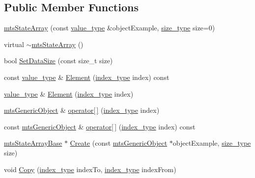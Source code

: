 \subsection*{Public Member Functions}
\begin{DoxyCompactItemize}
\item 
\hyperlink{classmts_state_array_a3100d37141bac1c739cf79fb761b28e8}{mts\-State\-Array} (const \hyperlink{classmts_state_array_a1d78f1e353af8687797d4a359b694ee1}{value\-\_\-type} \&object\-Example, \hyperlink{classmts_state_array_base_a2a29f8b24a48620f67c907fc5592fc17}{size\-\_\-type} size=0)
\item 
virtual \hyperlink{classmts_state_array_a31aea7797304325d5724ac9c52613a3b}{$\sim$mts\-State\-Array} ()
\item 
bool \hyperlink{classmts_state_array_a3864cab02bda42e0e04712423c72ac16}{Set\-Data\-Size} (const size\-\_\-t size)
\item 
const \hyperlink{classmts_state_array_a1d78f1e353af8687797d4a359b694ee1}{value\-\_\-type} \& \hyperlink{classmts_state_array_a8bf09ef47789fa1a66fc22ccb4339164}{Element} (\hyperlink{classmts_state_array_base_a22ecbf65a907a7550951d12970f3df1d}{index\-\_\-type} index) const 
\item 
\hyperlink{classmts_state_array_a1d78f1e353af8687797d4a359b694ee1}{value\-\_\-type} \& \hyperlink{classmts_state_array_a7e6691934e346dc11c24cb9e07e0820c}{Element} (\hyperlink{classmts_state_array_base_a22ecbf65a907a7550951d12970f3df1d}{index\-\_\-type} index)
\item 
\hyperlink{classmts_generic_object}{mts\-Generic\-Object} \& \hyperlink{classmts_state_array_a3ce4d9065a8807833d7ff85c00c66449}{operator\mbox{[}$\,$\mbox{]}} (\hyperlink{classmts_state_array_base_a22ecbf65a907a7550951d12970f3df1d}{index\-\_\-type} index)
\item 
const \hyperlink{classmts_generic_object}{mts\-Generic\-Object} \& \hyperlink{classmts_state_array_a0c002191085699eaaa3fab8d1f8b753e}{operator\mbox{[}$\,$\mbox{]}} (\hyperlink{classmts_state_array_base_a22ecbf65a907a7550951d12970f3df1d}{index\-\_\-type} index) const 
\item 
\hyperlink{classmts_state_array_base}{mts\-State\-Array\-Base} $\ast$ \hyperlink{classmts_state_array_ac82b7151bf8a7e733a043555d3312378}{Create} (const \hyperlink{classmts_generic_object}{mts\-Generic\-Object} $\ast$object\-Example, \hyperlink{classmts_state_array_base_a2a29f8b24a48620f67c907fc5592fc17}{size\-\_\-type} size)
\item 
void \hyperlink{classmts_state_array_afca557827cf934c90381a27704f0f064}{Copy} (\hyperlink{classmts_state_array_base_a22ecbf65a907a7550951d12970f3df1d}{index\-\_\-type} index\-To, \hyperlink{classmts_state_array_base_a22ecbf65a907a7550951d12970f3df1d}{index\-\_\-type} index\-From)
\end{DoxyCompactItemize}

